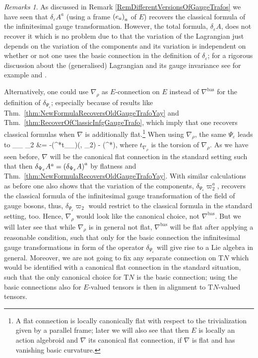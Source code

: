 \documentclass[CM,GP]{degruyter-crelle}       %
\def\ba#1\ea{\begin{align}#1\end{align}}
\theoremstyle{plain}
\theoremstyle{remark}
\newtheorem{remark}[theorem]{Remarks}
\theoremstyle{definition}
\begin{document}
\begin{remark}\label{WhyNablaBasPartOne}
\leavevmode\newline
As discussed in Remark \ref{RemDifferentVersionsOfGaugeTrafos} we have seen that $\delta_\varepsilon A^a$ (using a frame $\mleft( e_a \mright)_a$ of $E$) recovers the classical formula of the infinitesimal gauge transformation. However, the total formula, $\delta_\varepsilon A$, does not recover it which is no problem due to that the variation of the Lagrangian just depends on the variation of the components and its variation is independent on whether or not one uses the basic connection in the definition of $\delta_\varepsilon$; for a rigorous discussion about the (generalised) Lagrangian and its gauge invariance see for example \cite{CurvedYMH} and \cite[\S 4]{MyThesis}.

Alternatively, one could use $\nabla_\rho$ as $E$-connection on $E$ instead of $\nabla^{\mathrm{bas}}$ for the definition of $\delta_{\Psi_\varepsilon}$; especially because of results like Thm.~\ref{thm:NewFormulaRecoversOldGaugeTrafoYay} and Thm.~\ref{thm:RecoverOfClassicInfgGaugeTrafo}, which imply that one recovers classical formulas when $\nabla$ is additionally flat.\footnote{A flat connection is locally canonically flat with respect to the trivialization given by a parallel frame; later we will also see that then $E$ is locally an action algebroid and $\nabla$ its canonical flat connection, if $\nabla$ is flat and has vanishing basic curvature.} When using $\nabla_\rho$, the same $\Psi_\varepsilon$ leads to
\ba
\delta_{\Psi_\varepsilon} \varpi_2
&=
-({}^*t_{\nabla_\rho})(\varepsilon, \varpi_2) - ({}^*\nabla)\varepsilon,
\ea
where $t_{\nabla_\rho}$ is the torsion of $\nabla_\rho$. As we have seen before, $\nabla$ will be the canonical flat connection in the standard setting such that then $\delta_{\Psi_\varepsilon} A^a = \mleft(\delta_{\Psi_\varepsilon} A \mright)^a$ by flatness and Thm.~\ref{thm:NewFormulaRecoversOldGaugeTrafoYay}. With similar calculations as before one also shows that the variation of the components, $\delta_{\Psi_\varepsilon} \varpi_2^a$, recovers the classical formula of the infinitesimal gauge transformation of the field of gauge bosons, thus, $\delta_{\Psi_\varepsilon} \varpi_2$ would restrict to the classical formula in the standard setting, too. Hence, $\nabla_\rho$ would look like the canonical choice, not $\nabla^{\mathrm{bas}}$. But we will later see that while $\nabla_\rho$ is in general not flat, $\nabla^{\mathrm{bas}}$ will be flat after applying a reasonable condition, such that only for the basic connection the infinitesimal gauge transformations in form of the operator $\delta_{\Psi_\varepsilon}$ will give rise to a Lie algebra in general. Moreover, we are not going to fix any separate connection on $\mathrm{T}N$ which would be identified with a canonical flat connection in the standard situation, such that the only canonical choice for $\mathrm{T}N$ is the basic connection; using the basic connections also for $E$-valued tensors is then in alignment to $\mathrm{T}N$-valued tensors.
\end{remark}
\end{document}
